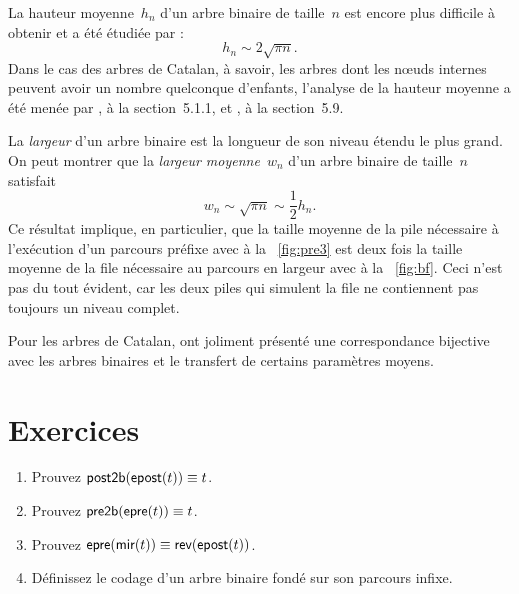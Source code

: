 
La hauteur moyenne~\(h_n\) d'un
arbre binaire de taille~\(n\) est encore plus difficile à obtenir et a
été étudiée par
\cite{FlajoletOdlyzko_1981,BrownShubert_1984,FlajoletOdlyzko_1984,Odlyzko_1984}:
\begin{equation*}
h_n \sim 2 \sqrt{\pi n}.
\end{equation*}
Dans le cas des arbres de Catalan, à savoir, les arbres dont les
nœuds internes peuvent avoir un nombre quelconque d'enfants,
l'analyse de la hauteur moyenne a été menée par
\cite{DasarathyYang_1980,DershowitzZaks_1981}, \cite{Kemp_1984} à la
section~5.1.1, \cite{DershowitzZaks_1990,KnuthdeBruijnRice_2000b} et
\cite{SedgewickFlajolet_1996}, à la
section~5.9.


La \emph{largeur} d'un arbre binaire est
la longueur de son niveau étendu le plus grand. On peut montrer que la \emph{largeur
  moyenne}~\(w_n\) d'un arbre binaire de
taille~\(n\) satisfait
\begin{equation*}
w_n \sim \sqrt{\pi n} \sim \frac{1}{2} h_n.
\end{equation*}
Ce résultat implique, en particulier, que la taille moyenne de la pile
nécessaire à l'exécution d'un parcours préfixe avec
 à la
\fig~\vref{fig:pre3} est deux fois la taille moyenne de la file
nécessaire au parcours en largeur avec 
à la \fig~\vref{fig:bf}. Ceci n'est pas du tout évident, car les deux
piles qui simulent la file ne contiennent pas toujours un niveau
complet.

Pour les arbres de Catalan, \cite{DasarathyYang_1980} ont joliment
présenté une correspondance bijective avec les arbres binaires et le
transfert de certains paramètres moyens.

\vspace*{-10pt}

\section*{Exercices}

\begin{enumerate}

  \item Prouvez \(\textsf{post2b}(\textsf{epost}(t)) \equiv t\).

  \item Prouvez \(\textsf{pre2b}(\textsf{epre}(t)) \equiv t\).

  \item Prouvez \(\textsf{epre}(\textsf{mir}(t)) \equiv
    \textsf{rev}(\textsf{epost}(t))\).

  \item Définissez le codage d'un arbre binaire fondé sur son parcours
    infixe.

\end{enumerate}
